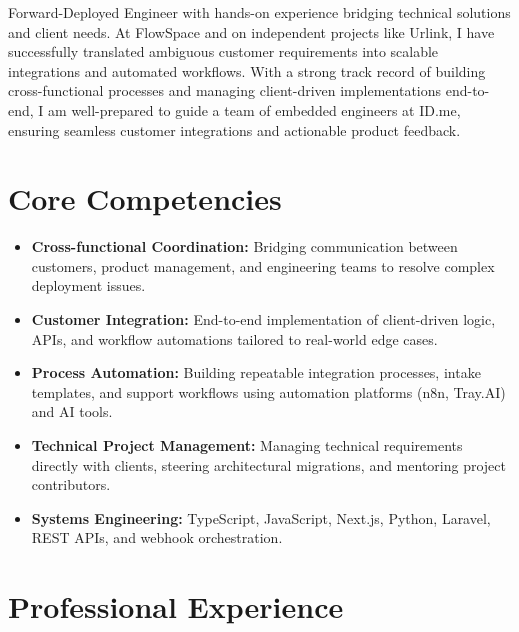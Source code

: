 \documentclass[11pt,a4paper,sans]{moderncv}
\begin{document}
\makecvtitle

Forward-Deployed Engineer with hands-on experience bridging technical solutions and client needs. At FlowSpace and on independent projects like Urlink, I have successfully translated ambiguous customer requirements into scalable integrations and automated workflows. With a strong track record of building cross-functional processes and managing client-driven implementations end-to-end, I am well-prepared to guide a team of embedded engineers at ID.me, ensuring seamless customer integrations and actionable product feedback.

\section{Core Competencies}
\begin{itemize}
\item \textbf{Cross-functional Coordination:} Bridging communication between customers, product management, and engineering teams to resolve complex deployment issues.
\item \textbf{Customer Integration:} End-to-end implementation of client-driven logic, APIs, and workflow automations tailored to real-world edge cases.
\item \textbf{Process Automation:} Building repeatable integration processes, intake templates, and support workflows using automation platforms (n8n, Tray.AI) and AI tools.
\item \textbf{Technical Project Management:} Managing technical requirements directly with clients, steering architectural migrations, and mentoring project contributors.
\item \textbf{Systems Engineering:} TypeScript, JavaScript, Next.js, Python, Laravel, REST APIs, and webhook orchestration.
\end{itemize}

\vspace{3pt}
\section{Professional Experience}
\end{document}
